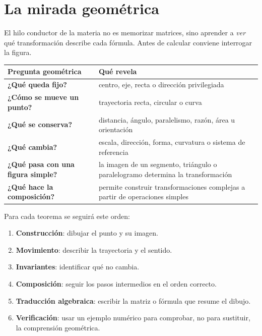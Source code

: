 \section{La mirada geométrica}\label{cap:03}

El hilo conductor de la materia no es memorizar matrices, sino aprender a \emph{ver} qué
transformación describe cada fórmula. Antes de calcular conviene interrogar la figura.

\begin{center}
\begin{tabularx}{\textwidth}{>{\bfseries}p{38mm} X}
\toprule
Pregunta geométrica & Qué revela\\
\midrule
¿Qué queda fijo? & centro, eje, recta o dirección privilegiada\\
¿Cómo se mueve un punto? & trayectoria recta, circular o curva\\
¿Qué se conserva? & distancia, ángulo, paralelismo, razón, área u orientación\\
¿Qué cambia? & escala, dirección, forma, curvatura o sistema de referencia\\
¿Qué pasa con una figura simple? & la imagen de un segmento, triángulo o paralelogramo
determina la transformación\\
¿Qué hace la composición? & permite construir transformaciones complejas a partir de
operaciones simples\\
\bottomrule
\end{tabularx}
\end{center}

\begin{idea}
Para cada teorema se seguirá este orden:
\begin{enumerate}
  \item \textbf{Construcción}: dibujar el punto y su imagen.
  \item \textbf{Movimiento}: describir la trayectoria y el sentido.
  \item \textbf{Invariantes}: identificar qué no cambia.
  \item \textbf{Composición}: seguir los pasos intermedios en el orden correcto.
  \item \textbf{Traducción algebraica}: escribir la matriz o fórmula que resume el dibujo.
  \item \textbf{Verificación}: usar un ejemplo numérico para comprobar, no para sustituir,
  la comprensión geométrica.
\end{enumerate}
\end{idea}

